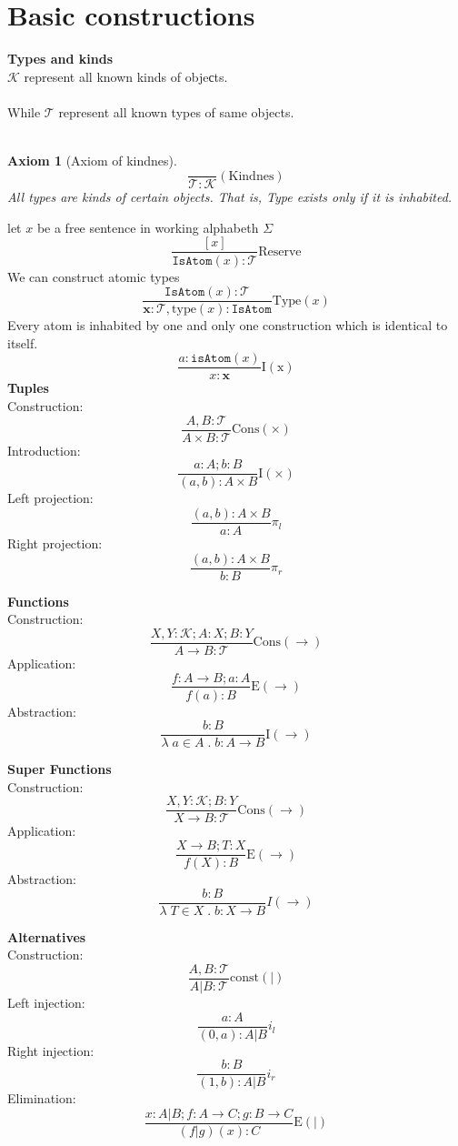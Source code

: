 \documentclass{article}
\newtheorem{axiom}{Axiom}
\newcommand{\Kind}{\mathcal{K}}
\newcommand{\Type}{\mathcal{T}}
\newcommand{\is}{:}
\renewcommand{\.}{\; . \;}
\begin{document}
\section{Basic constructions}
\textbf{Types and kinds} \\
$\Kind$ represent all known kinds of objeсts. \\
\\
While $\Type$ represent all known types of same objects. \\
\\
\begin{axiom}[Axiom of kindnes]
$$ \frac{}{\Type \is \Kind}(\mathrm{Kindnes}) $$
All types are kinds of certain objects. That is, Type exists only if it is inhabited.
\end{axiom}
let $x$ be a free sentence in working alphabeth $\Sigma$
$$\frac{[x]}{\mathtt{IsAtom}(x) \is \Type  }\mathrm{Reserve} $$
We can construct atomic types
$$ \frac{\mathtt{IsAtom}(x) \is \Type}{ \mathbf{x}  \is \Type,
\mathrm{type}(x) \is \mathtt{IsAtom}}\mathrm{Type}(x) $$
Every atom is inhabited by one and only one construction which is identical to itself.
$$ \frac{ a : \mathtt{isAtom}(x)}{  x : \mathbf{x}} \mathrm{I(x)}$$
\textbf{Tuples} \\
Construction:
$$\frac{A,B : \Type}{A \times B : \Type}\mathrm{Cons(\times)}$$ 
Introduction:
$$\frac{a : A ; b : B}{ (a,b) : A \times B } \mathrm{I(\times)}$$ 
Left projection:
$$ \frac{ (a,b) : A \times B}{a : A} \pi_l$$ 
Right projection:
$$ \frac{ (a,b) : A \times B}{b : B} \pi_r$$ 

\textbf{Functions} \\
Construction:
$$\frac{X,Y : \Kind; A : X ; B : Y}{A \to B : \Type}\mathrm{Cons(\to)}$$ 
Application:
$$\frac{f : A \to B; a : A}{ f(a) : B}\mathrm{E}(\to)$$ 
Abstraction:
$$ \frac{  b : B }{ \lambda \; a \in A \; . \; b : A \to B}\mathrm{I}(\to)$$ 

\textbf{Super Functions} \\
Construction:
$$\frac{X,Y : \Kind;  B : Y}{ X \to B : \Type}\mathrm{Cons(\to)}$$ 
Application:
$$ \frac{ X \to B; T : X} {f(X) : B}\mathrm{E}(\to)$$ 
Abstraction:
$$  \frac{  b : B}{ \lambda \; T \in X \; . \; b : X \to B}I(\to) $$ 

\textbf{Alternatives} \\
Construction:
$$\frac{A,B : \Type}{A | B : \Type}\mathrm{const}(|)$$ 
Left injection:
$$\frac{a : A}{  (0,a) : A | B}i_l$$ 
Right injection:
$$ \frac{ b : B}{ (1,b) : A | B}i_r$$ 
Elimination:
$$\frac{x : A | B ;  f : A \to C ; g : B \to C}{ (f | g)(x) : C}\mathrm{E}(|)$$ 
\end{document}
